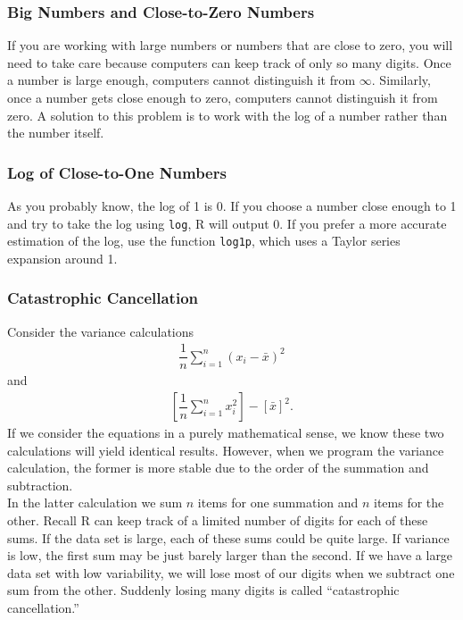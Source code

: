 \documentclass{article}
\begin{document}
\subsubsection{Big Numbers and Close-to-Zero Numbers}
If you are working with large numbers or numbers that are close to zero, you will need to take care because computers can keep track of only so many digits. Once a number is large enough,  computers cannot distinguish it from $\infty$. Similarly, once a number gets close enough to zero, computers cannot distinguish it from zero. A solution to this problem is to work with the log of a  number rather  than the number itself. 

\subsubsection{Log of Close-to-One Numbers}
As you probably know, the log of 1 is 0. If you choose a number close enough to 1 and try to take the log   using \texttt{log}, R will output 0. If you prefer a more accurate estimation of the log, use the function \texttt{log1p}, which uses a Taylor series expansion around 1.


\subsubsection{Catastrophic Cancellation}

Consider the variance calculations
\begin{align*}
\dfrac{1}{n} \sum_{i=1}^n (x_i - \bar{x})^2 
\end{align*}
and
\begin{align*}
\left[ \dfrac{1}{n}  \sum_{i=1}^n x_i^2 \right] - \left[\bar{x} \right]^2 .
\end{align*}
If we consider the equations in a purely  mathematical sense, we know these two calculations will yield identical results. However, when we program the variance calculation, the former is more stable due to the order of the summation and subtraction.  \\

 In the latter calculation we sum $n$ items for one summation and $n$ items for the other.  Recall  R can keep track of a limited number of digits for each of these sums. If the data set is large, each of these sums could be quite large. If  variance is low, the first sum may be just barely larger than the second. If we have a large data set with low variability, we will lose most of our digits when we subtract one sum from the other. Suddenly losing many digits is called ``catastrophic cancellation.''\\
\end{document}
